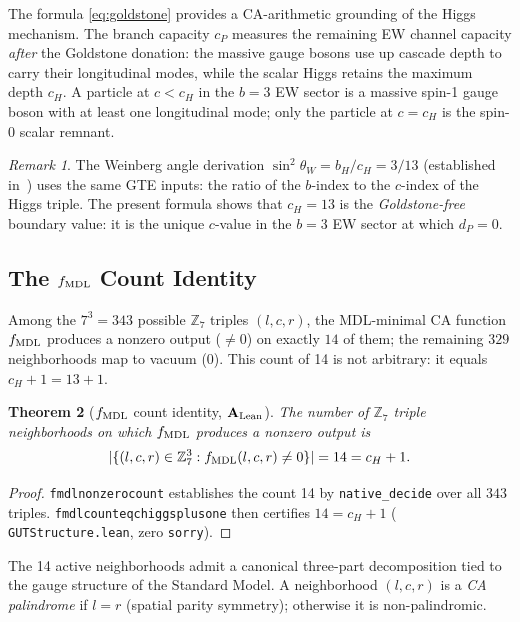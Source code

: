 \documentclass[11pt]{article}
\newtheorem{theorem}{Theorem}[section]
\theoremstyle{remark}
\newtheorem{remark}[theorem]{Remark}
\newcommand{\cH}{c_H}
\newcommand{\lean}[1]{%
  \penalty-100
  \begingroup\def\_{\textunderscore\allowbreak}\texttt{#1}\endgroup}
\newcommand{\sinwsq}{\sin^2\!\theta_W}
\newcommand{\CatAL}{\ensuremath{\textbf{A}_{\rm Lean}}}
\begin{document}
The formula \eqref{eq:goldstone} provides a CA-arithmetic grounding of the Higgs
mechanism.
The branch capacity $c_P$ measures the remaining EW channel capacity \emph{after}
the Goldstone donation: the massive gauge bosons use up cascade depth to carry their
longitudinal modes, while the scalar Higgs retains the maximum depth $c_H$.
A particle at $c < c_H$ in the $b=3$ EW sector is a massive spin-1 gauge boson with
at least one longitudinal mode; only the particle at $c = c_H$ is the spin-0 scalar
remnant.

\begin{remark}
The Weinberg angle derivation $\sinwsq = b_H / c_H = 3/13$
(established in~\cite{SpivackWeinberg}) uses the same GTE inputs: the
ratio of the $b$-index to the $c$-index of the Higgs triple.
The present formula shows that $c_H = 13$ is the \emph{Goldstone-free}
boundary value: it is the unique $c$-value in the $b=3$ EW sector at which
$d_P = 0$.
\end{remark}

\subsection{The \texorpdfstring{$f_{\rm MDL}$}{fMDL} Count Identity}
\label{sec:fmdl_count}

Among the $7^3 = 343$ possible $\mathbb{Z}_7$ triples $(l, c, r)$, the MDL-minimal
CA function $f_{\rm MDL}$ produces a nonzero output ($\neq 0$) on exactly $14$ of them;
the remaining $329$ neighborhoods map to vacuum ($0$).
This count of 14 is not arbitrary: it equals $\cH + 1 = 13 + 1$.

\begin{theorem}[$f_{\rm MDL}$ count identity, $\CatAL$]\label{thm:fmdl_count}
The number of $\mathbb{Z}_7$ triple neighborhoods on which $f_{\rm MDL}$ produces a
nonzero output is
\[
|\{(l,c,r) \in \mathbb{Z}_7^3 : f_{\rm MDL}(l,c,r) \neq 0\}| = 14 = \cH + 1.
\]
\end{theorem}

\begin{proof}
\lean{fmdl\_nonzero\_count\_14} establishes the count 14 by \texttt{native\_decide}
over all $343$ triples.
\lean{fmdl\_count\_eq\_chiggs\_plus\_one} then certifies $14 = c_H + 1$
(\lean{GUTStructure.lean}, zero \texttt{sorry}).
\end{proof}

The 14 active neighborhoods admit a canonical three-part decomposition tied to
the gauge structure of the Standard Model.
A neighborhood $(l, c, r)$ is a \emph{CA palindrome} if $l = r$ (spatial parity symmetry);
otherwise it is non-palindromic.
\end{document}
